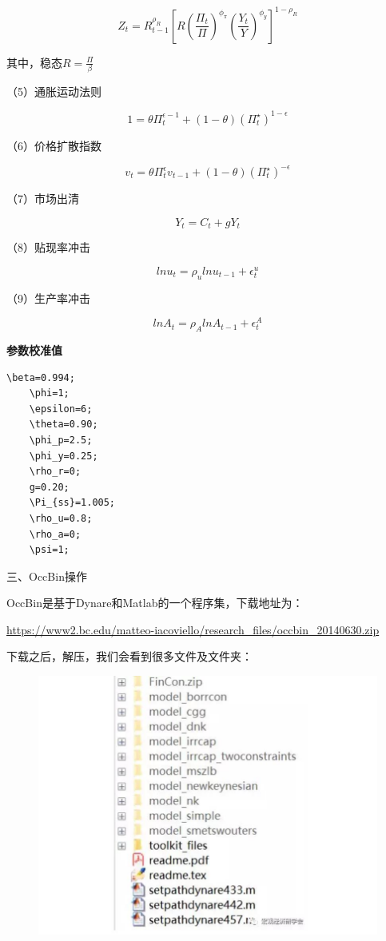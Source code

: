 \documentclass[cn,10pt,math=newtx,citestyle=gb7714-2015,bibstyle=gb7714-2015]{elegantbook}
\begin{document}
$$Z_t=R_{t-1}^{\rho_R}\left[R\left(\frac{\Pi_t}{\Pi}\right)^{\phi_{\pi}}\left(\frac{Y_t}{Y}\right)^{\phi_y}\right]^{1-\rho_R}$$

其中，稳态$R=\frac{\Pi}{\beta}$

（5）通胀运动法则

$$1=\theta\Pi_t^{\epsilon-1}+(1-\theta)(\Pi_t^{\star})^{1-\epsilon}$$

（6）价格扩散指数

$$v_t=\theta\Pi_t^{\epsilon}v_{t-1}+(1-\theta)(\Pi_t^{\star})^{-\epsilon}$$

（7）市场出清

$$Y_t=C_t+gY_t$$


（8）贴现率冲击

$$lnu_t=\rho_ulnu_{t-1}+\epsilon_t^u$$

（9）生产率冲击

$$lnA_t=\rho_AlnA_{t-1}+\epsilon_t^A$$


\textbf{参数校准值}
\begin{lstlisting}[frame=shadowbox]
	\beta=0.994;
	\phi=1;
	\epsilon=6;
	\theta=0.90;
	\phi_p=2.5;
	\phi_y=0.25;
	\rho_r=0;
	g=0.20;
	\Pi_{ss}=1.005;
	\rho_u=0.8;
	\rho_a=0;
	\psi=1;
\end{lstlisting}

三、OccBin操作

OccBin是基于Dynare和Matlab的一个程序集，下载地址为：

\url{https://www2.bc.edu/matteo-iacoviello/research_files/occbin_20140630.zip}

下载之后，解压，我们会看到很多文件及文件夹：

\begin{figure}[htbp!]
	\centering
	\includegraphics[width=0.5\linewidth]{FIG/folders}
	\centering
\end{figure}
\end{document}
